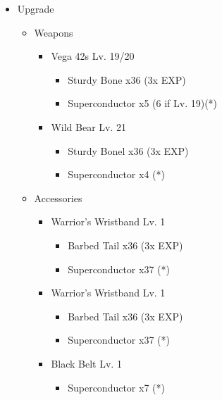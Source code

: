 \begin{upgrade}
\begin{multicols}{2}
\begin{itemize}
    \item Upgrade
    \begin{itemize}
        \item Weapons
        \begin{itemize}
            \item Vega 42s Lv. 19/20
            \begin{itemize}
                \item Sturdy Bone x36 (3x EXP)
                \item Superconductor x5 (6 if Lv. 19)(*)
            \end{itemize}
            \item Wild Bear Lv. 21
            \begin{itemize}
                \item Sturdy Bonel x36 (3x EXP)
                \item Superconductor x4 (*)
            \end{itemize}
         \end{itemize}
         \columnbreak
         \item Accessories
         \begin{itemize}
            \item Warrior's Wristband Lv. 1
            \begin{itemize}
                \item Barbed Tail x36 (3x EXP)
                \item Superconductor x37 (*)
            \end{itemize}
            \item Warrior's Wristband Lv. 1
            \begin{itemize}
                \item Barbed Tail x36 (3x EXP)
                \item Superconductor x37 (*)
            \end{itemize}
            \item Black Belt Lv. 1
            \begin{itemize}
                \item Superconductor x7 (*)
            \end{itemize}
        \end{itemize}
    \end{itemize}
\end{itemize}
\end{multicols}
\end{upgrade}
